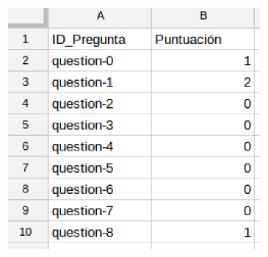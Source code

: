 \documentclass{beamer}
\begin{document}
\begin{frame}[allowframebreaks]
\begin{itemize}
    \begin{center}
      \includegraphics[width=0.5\textwidth]{img/app5.eps}
    \end{center}
    
  \end{itemize}
\end{frame}
\end{document}
